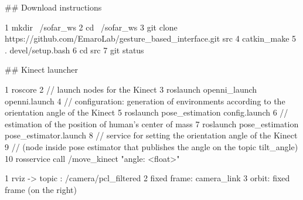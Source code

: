 \#\# Download instructions 
\begin{DoxyCode}
1 mkdir ~/sofar\_ws
2 cd ~/sofar\_ws
3 git clone https://github.com/EmaroLab/gesture\_based\_interface.git src
4 catkin\_make
5 . devel/setup.bash
6 cd src
7 git status
\end{DoxyCode}


\#\# Kinect launcher 
\begin{DoxyCode}
1 roscore
2 // launch nodes for the Kinect
3 roslaunch openni\_launch openni.launch
4 // configuration: generation of environments according to the orientation angle of the Kinect
5 roslaunch pose\_estimation config.launch
6 // estimation of the position of human's center of mass
7 roslaunch pose\_estimation pose\_estimator.launch
8 // service for setting the orientation angle of the Kinect 
9 // (node inside pose estimator that publishes the angle on the topic tilt\_angle)
10 rosservice call /move\_kinect "angle: <float>"
\end{DoxyCode}



\begin{DoxyCode}
1 rviz -> topic : /camera/pcl\_filtered
2     fixed frame: camera\_link
3     orbit: fixed frame (on the right)
\end{DoxyCode}
 